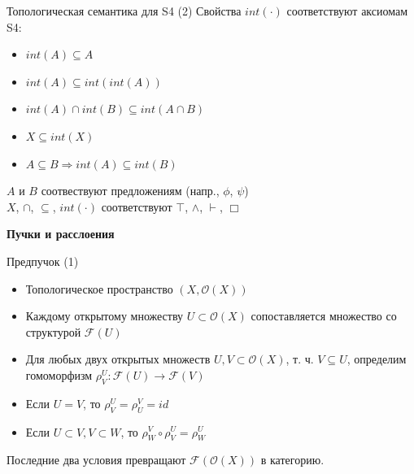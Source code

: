 \documentclass{beamer}
\begin{document}
\begin{frame}{Топологическая семантика для S4 (2)}
Свойства $int(\cdot)$ соответствуют аксиомам S4:\\
\bigskip
\begin{itemize}
	\item $int(A) \subseteq A$
	\item $int(A) \subseteq int(int(A))$
	\item $int(A) \cap int(B) \subseteq int(A \cap B)$
	\item $X \subseteq int(X)$
	\item $A \subseteq B \Longrightarrow int(A) \subseteq int(B)$
\end{itemize}
\bigskip
\begin{footnotesize}
$A$ и $B$ соотвествуют предложениям (напр., $\phi$, $\psi$)\\
$X$, $\cap$, $\subseteq$, $int(\cdot)$ соответствуют $\top$, $\wedge$, $\vdash$, $\Box$
\end{footnotesize}
\end{frame}



\begin{frame}{}
\begin{center}
	\textbf{Пучки и расслоения}
\end{center}
\end{frame}

\begin{frame}{Предпучок (1)}
\begin{itemize}
	\item Топологическое пространство $(X, \mathcal{O}(X))$
	\item Каждому открытому множеству $U \subset \mathcal{O}(X)$ сопоставляется множество со структурой $\mathcal{F}(U)$
	\item Для любых двух открытых множеств $U, V \subset \mathcal{O}(X)$, т. ч. $V \subseteq U$, определим гомоморфизм $\rho^U_V : \mathcal{F}(U) \to \mathcal{F}(V)$
	\item Если $U = V$, то $\rho^U_V = \rho^V_U = id$
	\item Если $U \subset V, V \subset W$, то $\rho^V_W \circ \rho^U_V = \rho^U_W$
\end{itemize}
\bigskip
Последние два условия превращают $\mathcal{F}(\mathcal{O}(X))$ в категорию.
\end{frame}
\end{document}
